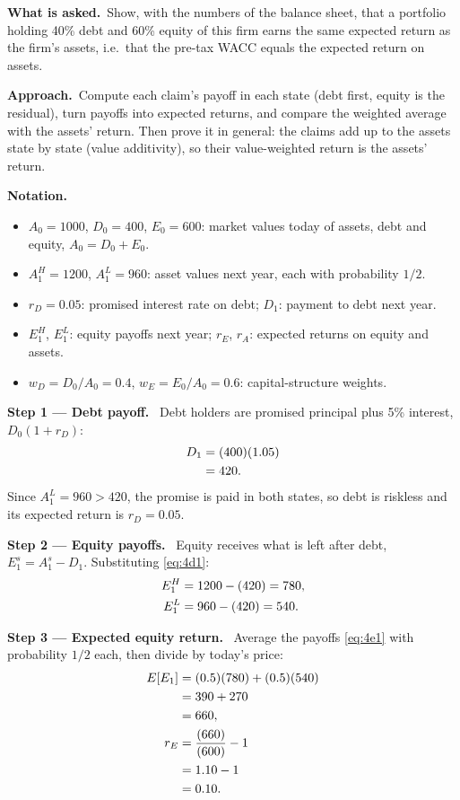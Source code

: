 \documentclass[11pt,a4paper]{article}
\numberwithin{equation}{section}
\newcommand{\step}[2]{\par\medskip\noindent\textbf{Step #1 --- #2.}~}
\newenvironment{notation}{\par\noindent\textbf{Notation.}\begin{itemize}[leftmargin=1.4em]}{\end{itemize}}
\newcommand{\asked}{\par\medskip\noindent\textbf{What is asked.}~}
\newcommand{\approach}{\par\smallskip\noindent\textbf{Approach.}~}
\begin{document}
\asked Show, with the numbers of the balance sheet, that a portfolio holding 40\% debt and 60\%
equity of this firm earns the same expected return as the firm's assets, i.e.\ that the pre-tax
WACC equals the expected return on assets.

\approach Compute each claim's payoff in each state (debt first, equity is the residual), turn
payoffs into expected returns, and compare the weighted average with the assets' return. Then
prove it in general: the claims add up to the assets state by state (value additivity), so their
value-weighted return is the assets' return.

\begin{notation}
  \item $A_0=1000$, $D_0=400$, $E_0=600$: market values today of assets, debt and equity, $A_0=D_0+E_0$.
  \item $A_1^H=1200$, $A_1^L=960$: asset values next year, each with probability $1/2$.
  \item $r_D=0.05$: promised interest rate on debt; $D_1$: payment to debt next year.
  \item $E_1^H$, $E_1^L$: equity payoffs next year; $r_E$, $r_A$: expected returns on equity and assets.
  \item $w_D=D_0/A_0=0.4$, $w_E=E_0/A_0=0.6$: capital-structure weights.
\end{notation}

\step{1}{Debt payoff} Debt holders are promised principal plus 5\% interest, $D_0(1+r_D)$:
\begin{align}
  D_1 &= (400)(1.05) \notag\\
      &= 420. \label{eq:4d1}
\end{align}
Since $A_1^L=960>420$, the promise is paid in both states, so debt is riskless and its
expected return is $r_D=0.05$.

\step{2}{Equity payoffs} Equity receives what is left after debt, $E_1^s=A_1^s-D_1$. Substituting \eqref{eq:4d1}:
\begin{align}
  E_1^H &= 1200-(420) = 780, \notag\\
  E_1^L &= 960-(420) = 540. \label{eq:4e1}
\end{align}

\step{3}{Expected equity return} Average the payoffs \eqref{eq:4e1} with probability $1/2$ each,
then divide by today's price:
\begin{align}
  E[E_1] &= (0.5)(780) + (0.5)(540) \notag\\
         &= 390 + 270 \notag\\
         &= 660, \notag\\
  r_E &= \frac{(660)}{(600)} - 1 \notag\\
      &= 1.10 - 1 \notag\\
      &= 0.10. \label{eq:4re}
\end{align}
\end{document}
